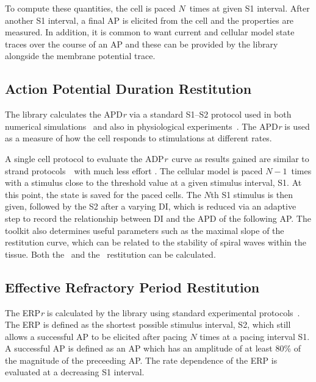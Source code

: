 To compute these quantities, the cell is paced $N$\ times at given S1 interval.
After another S1 interval, a final AP is elicited from the cell and the
properties are measured.  In addition, it is common to want current and
cellular model state traces over the course of an AP and these can be provided
by the library alongside the membrane potential trace.

\subsection{Action Potential Duration Restitution}

The library calculates the APD\emph{r} via a standard S1--S2 protocol used in both
numerical simulations~\cite{Kim2002,Xie2002,Qu1999,Cherry2004,Cherry2007,Decker2009} and also in physiological
experiments~\cite{Boyett1978,Taggart1996}.  The APD\emph{r} is used
as a measure of how the cell responds to stimulations at different rates.

A single cell protocol to evaluate the ADP\emph{r}\ curve as results gained are
similar to strand protocols~\cite{Xie2002,Decker2009}\ with much less effort .
The cellular model is paced $N-1$\ times with a stimulus close to the threshold
value at a given stimulus interval, S1.  At this point, the state is saved for the
paced cells.  The $N$th S1 stimulus is then given, followed by the S2 after a
varying DI, which is reduced via an adaptive step to record the relationship
between DI and the APD of the following AP.  The toolkit also determines useful
parameters such as the maximal slope of the restitution curve, which can be
related to the stability of spiral waves within the tissue.  Both the \apdr\ and
the \apdr[50]\ restitution can be calculated.

\subsection{Effective Refractory Period Restitution}

The ERP\emph{r} is calculated by the library using standard experimental
protocols~\cite{Workman2001,Kharche2008}.
The ERP is defined as the shortest possible stimulus interval, S2, which still
allows a successful AP to be elicited after pacing $N$ times at a pacing
interval S1.  A successful AP is defined as an AP which has an amplitude
of at least 80\% of the magnitude of the preceeding AP.  
The rate dependence of the ERP is evaluated at a decreasing S1 interval.

